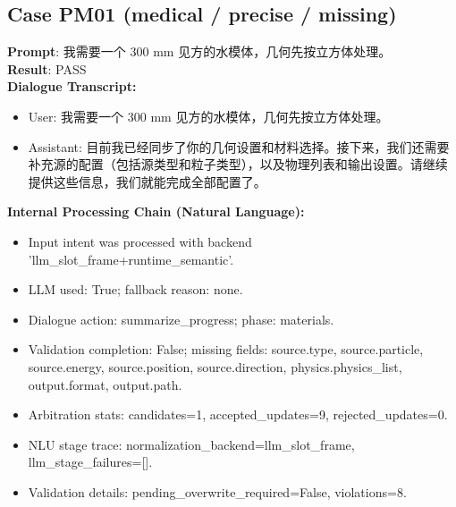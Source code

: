 \documentclass[11pt]{ctexart}
\begin{document}
\subsection{Case PM01 (medical / precise / missing)}
\textbf{Prompt}: 我需要一个 300 mm 见方的水模体，几何先按立方体处理。\\
\textbf{Result}: PASS\\
\textbf{Dialogue Transcript:}
\begin{itemize}
\item User: 我需要一个 300 mm 见方的水模体，几何先按立方体处理。
\item Assistant: 目前我已经同步了你的几何设置和材料选择。接下来，我们还需要补充源的配置（包括源类型和粒子类型），以及物理列表和输出设置。请继续提供这些信息，我们就能完成全部配置了。
\end{itemize}
\textbf{Internal Processing Chain (Natural Language):}
\begin{itemize}
\item Input intent was processed with backend 'llm\_slot\_frame+runtime\_semantic'.
\item LLM used: True; fallback reason: none.
\item Dialogue action: summarize\_progress; phase: materials.
\item Validation completion: False; missing fields: source.type, source.particle, source.energy, source.position, source.direction, physics.physics\_list, output.format, output.path.
\item Arbitration stats: candidates=1, accepted\_updates=9, rejected\_updates=0.
\item NLU stage trace: normalization\_backend=llm\_slot\_frame, llm\_stage\_failures=[].
\item Validation details: pending\_overwrite\_required=False, violations=8.
\end{itemize}
\end{document}
